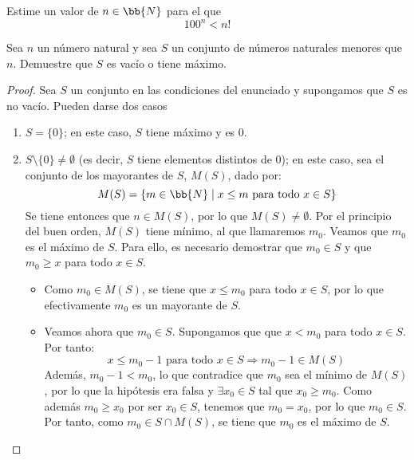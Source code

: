 \begin{ejercicio}
    Estime un valor de $n\in \bb{N}$ para el que
    $$100^n < n!$$

\end{ejercicio}

\begin{ejercicio}
Sea $n$ un número natural y sea $S$ un conjunto de números naturales menores que $n$. Demuestre que $S$ es vacío o tiene máximo.
\begin{proof}
Sea $S$ un conjunto en las condiciones del enunciado y supongamos que $S$ es no vacío. Pueden darse dos casos
\begin{enumerate}
    \item $S = \{0\}$; en este caso, $S$ tiene máximo y es $0$.
    \item $S\setminus\{0\} \neq \emptyset$ (es decir, $S$ tiene elementos distintos de $0$); en este caso, sea el conjunto de los mayorantes de $S$, $M(S)$, dado por:
    \begin{equation*}
        M(S) = \{ m \in \bb{N} \mid x \leq m \text{ para todo } x \in S\}
    \end{equation*}
    Se tiene entonces que $n\in M(S)$, por lo que $M(S)\neq \emptyset$. Por el principio del buen orden, $M(S)$ tiene mínimo, al que llamaremos $m_0$.
    Veamos que $m_0$ es el máximo de $S$. Para ello, es necesario demostrar que $m_0\in S$ y que $m_0\geq x$ para todo $x\in S$.
    \begin{itemize}
        \item Como $m_0\in M(S)$, se tiene que $x\leq m_0$ para todo $x\in S$, por lo que efectivamente $m_0$ es un mayorante de $S$.
        \item Veamos ahora que $m_0\in S$. Supongamos que que $x<m_0$ para todo $x\in S$.
        Por tanto:
        \begin{equation*}
            x\leq m_0 - 1 \text{ para todo } x\in S \Longrightarrow m_0 - 1 \in M(S)
        \end{equation*}
        Además, $m_0 - 1 < m_0$, lo que contradice que $m_0$ sea el mínimo de $M(S)$, por lo que la hipótesis era falsa y $\exists x_0\in S$ tal que $x_0\geq m_0$.
        Como además $m_0\geq x_0$ por ser $x_0\in S$, tenemos que $m_0 = x_0$, por lo que $m_0\in S$.
        Por tanto, como $m_0\in S\cap M(S)$, se tiene que $m_0$ es el máximo de $S$.\qedhere
    \end{itemize}
\end{enumerate}
\end{proof}
\end{ejercicio}

